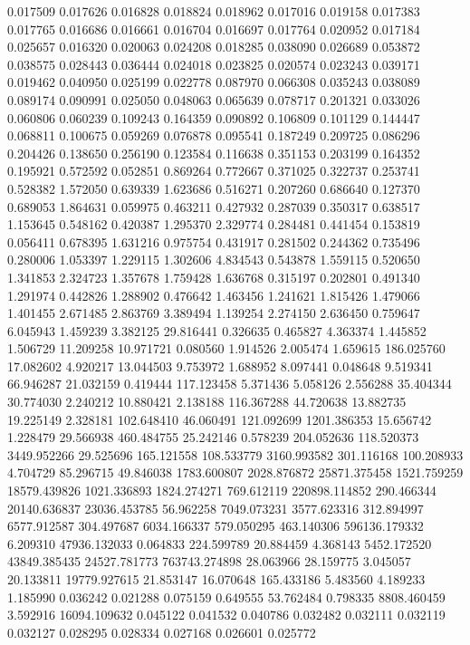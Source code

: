 0.017509
0.017626
0.016828
0.018824
0.018962
0.017016
0.019158
0.017383
0.017765
0.016686
0.016661
0.016704
0.016697
0.017764
0.020952
0.017184
0.025657
0.016320
0.020063
0.024208
0.018285
0.038090
0.026689
0.053872
0.038575
0.028443
0.036444
0.024018
0.023825
0.020574
0.023243
0.039171
0.019462
0.040950
0.025199
0.022778
0.087970
0.066308
0.035243
0.038089
0.089174
0.090991
0.025050
0.048063
0.065639
0.078717
0.201321
0.033026
0.060806
0.060239
0.109243
0.164359
0.090892
0.106809
0.101129
0.144447
0.068811
0.100675
0.059269
0.076878
0.095541
0.187249
0.209725
0.086296
0.204426
0.138650
0.256190
0.123584
0.116638
0.351153
0.203199
0.164352
0.195921
0.572592
0.052851
0.869264
0.772667
0.371025
0.322737
0.253741
0.528382
1.572050
0.639339
1.623686
0.516271
0.207260
0.686640
0.127370
0.689053
1.864631
0.059975
0.463211
0.427932
0.287039
0.350317
0.638517
1.153645
0.548162
0.420387
1.295370
2.329774
0.284481
0.441454
0.153819
0.056411
0.678395
1.631216
0.975754
0.431917
0.281502
0.244362
0.735496
0.280006
1.053397
1.229115
1.302606
4.834543
0.543878
1.559115
0.520650
1.341853
2.324723
1.357678
1.759428
1.636768
0.315197
0.202801
0.491340
1.291974
0.442826
1.288902
0.476642
1.463456
1.241621
1.815426
1.479066
1.401455
2.671485
2.863769
3.389494
1.139254
2.274150
2.636450
0.759647
6.045943
1.459239
3.382125
29.816441
0.326635
0.465827
4.363374
1.445852
1.506729
11.209258
10.971721
0.080560
1.914526
2.005474
1.659615
186.025760
17.082602
4.920217
13.044503
9.753972
1.688952
8.097441
0.048648
9.519341
66.946287
21.032159
0.419444
117.123458
5.371436
5.058126
2.556288
35.404344
30.774030
2.240212
10.880421
2.138188
116.367288
44.720638
13.882735
19.225149
2.328181
102.648410
46.060491
121.092699
1201.386353
15.656742
1.228479
29.566938
460.484755
25.242146
0.578239
204.052636
118.520373
3449.952266
29.525696
165.121558
108.533779
3160.993582
301.116168
100.208933
4.704729
85.296715
49.846038
1783.600807
2028.876872
25871.375458
1521.759259
18579.439826
1021.336893
1824.274271
769.612119
220898.114852
290.466344
20140.636837
23036.453785
56.962258
7049.073231
3577.623316
312.894997
6577.912587
304.497687
6034.166337
579.050295
463.140306
596136.179332
6.209310
47936.132033
0.064833
224.599789
20.884459
4.368143
5452.172520
43849.385435
24527.781773
763743.274898
28.063966
28.159775
3.045057
20.133811
19779.927615
21.853147
16.070648
165.433186
5.483560
4.189233
1.185990
0.036242
0.021288
0.075159
0.649555
53.762484
0.798335
8808.460459
3.592916
16094.109632
0.045122
0.041532
0.040786
0.032482
0.032111
0.032119
0.032127
0.028295
0.028334
0.027168
0.026601
0.025772
